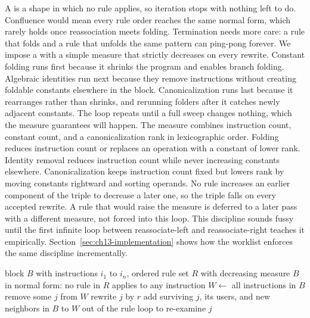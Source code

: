 A  is a shape in which no rule applies, so iteration stops with nothing left to do.
Confluence would mean every rule order reaches the same normal form, which rarely holds once reassociation meets folding.
Termination needs more care: a rule that folds and a rule that unfolds the same pattern can ping-pong forever.
We impose a  with a simple measure that strictly decreases on every rewrite.
Constant folding runs first because it shrinks the program and enables branch folding.
Algebraic identities run next because they remove instructions without creating foldable constants elsewhere in the block.
Canonicalization runs last because it rearranges rather than shrinks, and rerunning folders after it catches newly adjacent constants.
The loop repeats until a full sweep changes nothing, which the measure guarantees will happen.
The measure combines instruction count, constant count, and a canonicalization rank in lexicographic order.
Folding reduces instruction count or replaces an operation with a constant of lower rank.
Identity removal reduces instruction count while never increasing constants elsewhere.
Canonicalization keeps instruction count fixed but lowers rank by moving constants rightward and sorting operands.
No rule increases an earlier component of the triple to decrease a later one, so the triple falls on every accepted rewrite.
A rule that would raise the measure is deferred to a later pass with a different measure, not forced into this loop.
This discipline sounds fussy until the first infinite loop between reassociate-left and reassociate-right teaches it empirically.
Section~\ref{sec:ch13-implementation} shows how the worklist enforces the same discipline incrementally.

\begin{algorithm}
\caption{Local simplification to a normal form within one block}\label{alg:ch13-simplify}
\begin{pseudocode}
\Require block $B$ with instructions $i_1$ to $i_n$, ordered rule set $R$ with decreasing measure
\Ensure $B$ in normal form: no rule in $R$ applies to any instruction
\State $W \gets$ all instructions in $B$
\State remove some $j$ from $W$
\State rewrite $j$ by $r$
\State add surviving $j$, its users, and new neighbors in $B$ to $W$
\State \Break out of the rule loop to re-examine $j$
\EndIf
\EndFor
\EndWhile
\end{pseudocode}
\end{algorithm}

